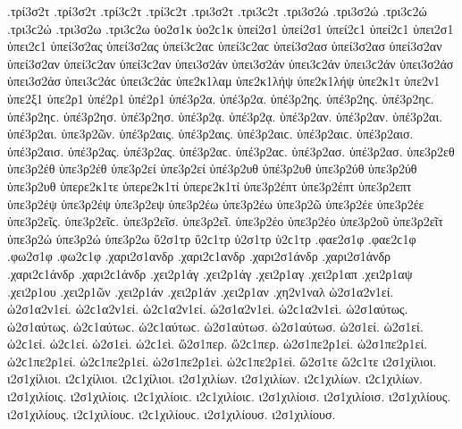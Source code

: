 {.τρί3σ2τ .τρί3σ2τ .τρί3ϲ2τ .τρί3ϲ2τ   %
.τρι3σ2τ .τρι3ϲ2τ 
.τρι3σ2ώ .τρι3σ2ώ .τρι3ϲ2ώ .τρι3ϲ2ώ   %
.τρι3σ2ω .τρι3ϲ2ω 
ὑο2σ1κ ὑο2ϲ1κ   %
ὑπεί2σ1 ὑπεί2σ1 ὑπεί2ϲ1 ὑπεί2ϲ1 
ὑπει2σ1 ὑπει2ϲ1 
ὑπεί3σ2ας ὑπεί3σ2ας ὑπεί3ϲ2αϲ ὑπεί3ϲ2αϲ   %
ὑπεί3σ2ασ ὑπεί3σ2ασ 
ὑπεί3σ2αν ὑπεί3σ2αν ὑπεί3ϲ2αν ὑπεί3ϲ2αν 
ὑπει3σ2άν ὑπει3σ2άν ὑπει3ϲ2άν ὑπει3ϲ2άν 
ὑπει3σ2άσ ὑπει3σ2άσ ὑπει3ϲ2άϲ ὑπει3ϲ2άϲ 
ὑπε2κ1λαμ   %
ὑπε2κ1λήψ ὑπε2κ1λήψ   %
ὑπε2κ1τ   %
ὑπε2ν1 
ὑπε2ξ1 
ὑπε2ρ1 
ὑπέ2ρ1 ὑπέ2ρ1 
ὑπέ3ρ2α. ὑπέ3ρ2α.   %
ὑπέ3ρ2ης. ὑπέ3ρ2ης. ὑπέ3ρ2ηϲ. ὑπέ3ρ2ηϲ. 
ὑπέ3ρ2ησ. ὑπέ3ρ2ησ. 
ὑπέ3ρ2ᾳ. ὑπέ3ρ2ᾳ. 
ὑπέ3ρ2αν. ὑπέ3ρ2αν. 
ὑπέ3ρ2αι. ὑπέ3ρ2αι. 
ὑπε3ρ2ῶν. 
ὑπέ3ρ2αις. ὑπέ3ρ2αις. ὑπέ3ρ2αιϲ. ὑπέ3ρ2αιϲ. 
ὑπέ3ρ2αισ. ὑπέ3ρ2αισ. 
ὑπέ3ρ2ας. ὑπέ3ρ2ας. ὑπέ3ρ2αϲ. ὑπέ3ρ2αϲ. 
ὑπέ3ρ2ασ. ὑπέ3ρ2ασ. 
ὑπε3ρ2εθ   %
ὑπε3ρ2έθ ὑπε3ρ2έθ 
ὑπε3ρ2εί ὑπε3ρ2εί   %
ὑπέ3ρ2υθ ὑπέ3ρ2υθ   %
ὑπε3ρ2ύθ ὑπε3ρ2ύθ 
ὑπε3ρ2υθ   %
ὑπερε2κ1τε   %
ὑπερε2κ1τί ὑπερε2κ1τί   %
ὑπε3ρ2έπτ ὑπε3ρ2έπτ   %
ὑπε3ρ2επτ 
ὑπε3ρ2έψ ὑπε3ρ2έψ 
ὑπε3ρ2εψ 
ὑπε3ρ2έω ὑπε3ρ2έω   %
ὑπε3ρ2ῶ 
ὑπε3ρ2έε ὑπε3ρ2έε 
ὑπε3ρ2εῖς. ὑπε3ρ2εῖϲ. 
ὑπε3ρ2εῖσ. 
ὑπε3ρ2εῖ. 
ὑπε3ρ2έο ὑπε3ρ2έο 
ὑπε3ρ2οῦ 
ὑπε3ρ2εῖτ 
ὑπε3ρ2ώ ὑπε3ρ2ώ   %
ὑπε3ρ2ω   %
ὕ2σ1τρ ὕ2ϲ1τρ   %
ὑ2σ1τρ ὑ2ϲ1τρ   %
.φαε2σ1φ .φαε2ϲ1φ   %
.φω2σ1φ .φω2ϲ1φ   %
.χαρι2σ1ανδρ .χαρι2ϲ1ανδρ   %
.χαρι2σ1άνδρ .χαρι2σ1άνδρ .χαρι2ϲ1άνδρ .χαρι2ϲ1άνδρ 
.χει2ρ1άγ .χει2ρ1άγ   %
.χει2ρ1αγ   %
.χει2ρ1απ   %
.χει2ρ1αψ   %
.χει2ρ1ου   %
.χει2ρ1ῶν   %
.χει2ρ1άν .χει2ρ1άν 
.χει2ρ1αν 
.χη2ν1ναλ   %
ὡ2σ1α2ν1εί. ὡ2σ1α2ν1εί. ὡ2ϲ1α2ν1εί. ὡ2ϲ1α2ν1εί.   %
ὡ2σ1α2ν1εὶ. ὡ2ϲ1α2ν1εὶ. 
ὡ2σ1αύτως. ὡ2σ1αύτως. ὡ2ϲ1αύτωϲ. ὡ2ϲ1αύτωϲ.   %
ὡ2σ1αύτωσ. ὡ2σ1αύτωσ. 
ὡ2σ1εί. ὡ2σ1εί. ὡ2ϲ1εί. ὡ2ϲ1εί.   %
ὡ2σ1εὶ. ὡ2ϲ1εὶ. 
ὥ2σ1περ. ὥ2ϲ1περ.   %
ὡ2σ1πε2ρ1εί. ὡ2σ1πε2ρ1εί. ὡ2ϲ1πε2ρ1εί. ὡ2ϲ1πε2ρ1εί.   %
ὡ2σ1πε2ρ1εὶ. ὡ2ϲ1πε2ρ1εὶ. 
ὥ2σ1τε ὥ2ϲ1τε   %
ι2σ1χίλιοι. ι2σ1χίλιοι. ι2ϲ1χίλιοι. ι2ϲ1χίλιοι.   %
ι2σ1χιλίων. ι2σ1χιλίων. ι2ϲ1χιλίων. ι2ϲ1χιλίων. 
ι2σ1χιλίοις. ι2σ1χιλίοις. ι2ϲ1χιλίοιϲ. ι2ϲ1χιλίοιϲ. 
ι2σ1χιλίοισ. ι2σ1χιλίοισ. 
ι2σ1χιλίους. ι2σ1χιλίους. ι2ϲ1χιλίουϲ. ι2ϲ1χιλίουϲ. 
ι2σ1χιλίουσ. ι2σ1χιλίουσ. 
}

